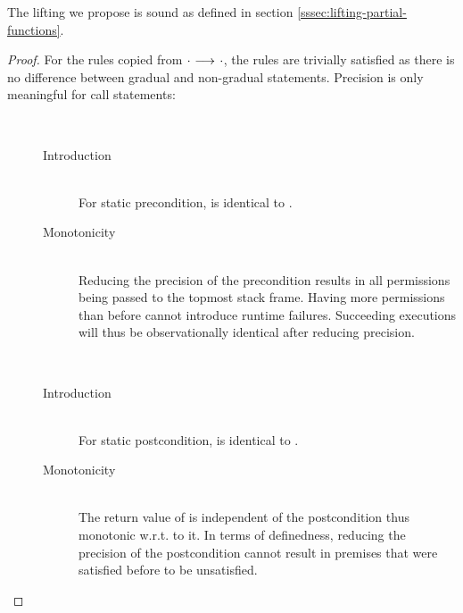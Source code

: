 \begin{lemma}
    The lifting we propose is sound as defined in section \ref{sssec:lifting-partial-functions}.
\end{lemma}
\begin{proof}
    For the rules copied from ${\cdot} \,\,{\longrightarrow^{}}\,\, {\cdot}$, the rules are trivially satisfied as there is no difference between gradual and non-gradual statements.
    Precision is only meaningful for call statements:

    \begin{description}
        \item[]~
        \begin{description}
            \item[Introduction]~\\
            For static precondition,  is identical to .
            
            \item[Monotonicity]~\\
            Reducing the precision of the precondition results in all permissions being passed to the topmost stack frame.
            Having more permissions than before cannot introduce runtime failures.
            Succeeding executions will thus be observationally identical after reducing precision.
        \end{description}
        
        \item[]~
        \begin{description}
            \item[Introduction]~\\
            For static postcondition,  is identical to .
            
            \item[Monotonicity]~\\
            The return value of  is independent of the postcondition thus monotonic w.r.t. to it.
            In terms of definedness, reducing the precision of the postcondition cannot result in premises that were satisfied before to be unsatisfied.
        \end{description}
    \end{description}
\end{proof}